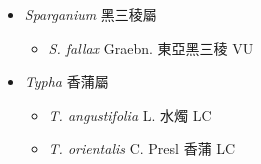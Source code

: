 
  \begin{itemize}
 \item[] \textit{Sparganium} 黑三稜屬
                                
  \begin{itemize}
        \item[] \textit{S. fallax} Graebn.  東亞黑三稜   VU
  \end{itemize}
 \item[] \textit{Typha} 香蒲屬
                                
  \begin{itemize}
        \item[] \textit{T. angustifolia} L.  水燭   LC
        \item[] \textit{T. orientalis} C. Presl  香蒲   LC
  \end{itemize}
  \end{itemize}
